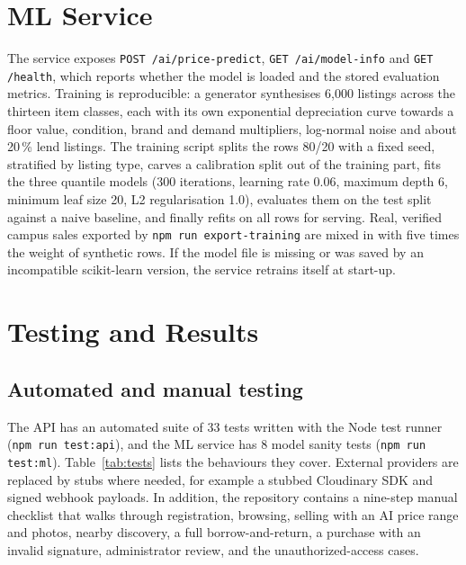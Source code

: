 \documentclass[11pt,letterpaper,oneside]{report}
\newcommand{\code}[1]{\texttt{#1}}
\begin{document}
\section{ML Service}
The service exposes \code{POST /ai/price-predict}, \code{GET /ai/model-info} and \code{GET /health}, which
reports whether the model is loaded and the stored evaluation metrics. Training is reproducible: a generator
synthesises 6{,}000 listings across the thirteen item classes, each with its own exponential depreciation
curve towards a floor value, condition, brand and demand multipliers, log-normal noise and about 20\,\%
lend listings. The training script splits the rows 80/20 with a fixed seed, stratified by listing type,
carves a calibration split out of the training part, fits the three quantile models (300 iterations,
learning rate 0.06, maximum depth 6, minimum leaf size 20, L2 regularisation 1.0), evaluates them on the
test split against a naive baseline, and finally refits on all rows for serving. Real, verified campus
sales exported by \code{npm run export-training} are mixed in with five times the weight of synthetic rows.
If the model file is missing or was saved by an incompatible scikit-learn version, the service retrains
itself at start-up.

\section{Testing and Results}
\subsection{Automated and manual testing}
The API has an automated suite of 33 tests written with the Node test runner (\code{npm run test:api}),
and the ML service has 8 model sanity tests (\code{npm run test:ml}). Table~\ref{tab:tests} lists the
behaviours they cover. External providers are replaced by stubs where needed, for example a stubbed
Cloudinary SDK and signed webhook payloads. In addition, the repository contains a nine-step manual
checklist that walks through registration, browsing, selling with an AI price range and photos, nearby
discovery, a full borrow-and-return, a purchase with an invalid signature, administrator review, and the
unauthorized-access cases.
\end{document}
